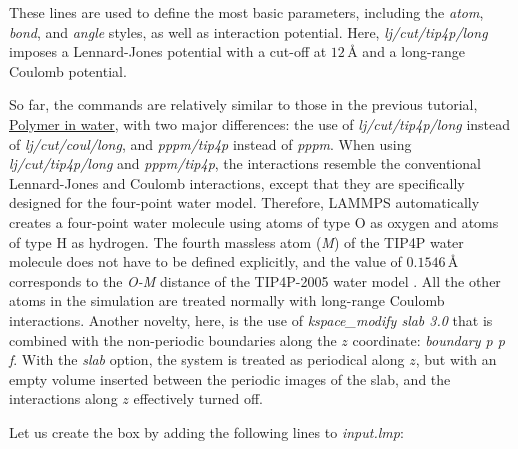\documentclass[9pt,tutorial]{livecoms}
\begin{document}
These lines are used to define the most basic parameters, including the
\textit{atom}, \textit{bond}, and \textit{angle} styles, as well as interaction
potential. Here, \textit{lj/cut/tip4p/long} imposes a Lennard-Jones potential with
a cut-off at $12\,\text{$\text{\AA{}}$}$ and a long-range Coulomb potential.

So far, the commands are relatively similar to those in the previous tutorial,
\hyperref[all-atoms-label]{Polymer in water}, with two major differences: the use
of \textit{lj/cut/tip4p/long} instead of \textit{lj/cut/coul/long}, and \textit{pppm/tip4p}
instead of \textit{pppm}. When using \textit{lj/cut/tip4p/long} and \textit{pppm/tip4p},
the interactions resemble the conventional Lennard-Jones and Coulomb interactions,
except that they are specifically designed for the four-point water model. Therefore,
LAMMPS automatically creates a four-point water molecule using atoms of type O as
oxygen and atoms of type H as hydrogen. The fourth massless atom (\textit{M}) of the
TIP4P water molecule does not have to be defined explicitly, and the value of
$0.1546\,\text{$\text{\AA{}}$}$ corresponds to the \textit{O-M} distance of the
TIP4P-2005 water model \cite{abascal2005general}. All the other atoms in the simulation
are treated normally with long-range Coulomb interactions. Another novelty, here, is
the use of \textit{kspace\_modify slab 3.0} that is combined with the non-periodic
boundaries along the $z$ coordinate: \textit{boundary p p f}. With the \textit{slab}
option, the system is treated as periodical along $z$, but with an empty volume inserted
between the periodic images of the slab, and the interactions along $z$ effectively turned off.

Let us create the box by adding the following lines to \textit{input.lmp}:
\end{document}

